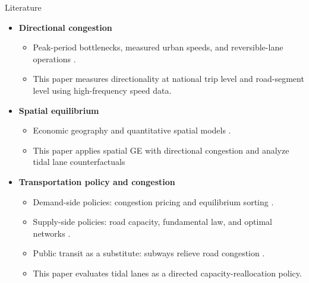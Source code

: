 \documentclass[11pt,aspectratio=169]{beamer}
\newcommand{\good}[1]{\textcolor{blue!70!black}{#1}}
\begin{document}
\begin{frame}{Literature}
\begin{itemize}\small
  \item \textbf{Directional congestion}
  \begin{itemize}\footnotesize
    \item Peak-period bottlenecks, measured urban speeds, and reversible-lane operations \citep{vickrey1969,arnott1993,couture2018,akbar2023,wolshon2006}.
    \item \good{This paper measures directionality at national trip level and road-segment level using high-frequency speed data.}
  \end{itemize}
  \item \textbf{Spatial equilibrium}
  \begin{itemize}\footnotesize
    \item Economic geography and quantitative spatial models \citep{krugman1991,eaton2002,allen2014,ahlfeldt2015}.
    \item \good{This paper applies spatial GE with directional congestion and analyze tidal lane counterfactuals}
  \end{itemize}
  \item \textbf{Transportation policy and congestion}
  \begin{itemize}\footnotesize
    \item Demand-side policies: congestion pricing and equilibrium sorting \citep{vickrey1969,kreindler2024,barwick2024,yang2020}.
    \item Supply-side policies: road capacity, fundamental law, and optimal networks \citep{duranton2011,fajgelbaum2020}.
    \item Public transit as a substitute: subways relieve road congestion \citep{gu2021}.
    \item \good{This paper evaluates tidal lanes as a directed capacity-reallocation policy.}
  \end{itemize}
\end{itemize}
\end{frame}
\end{document}
